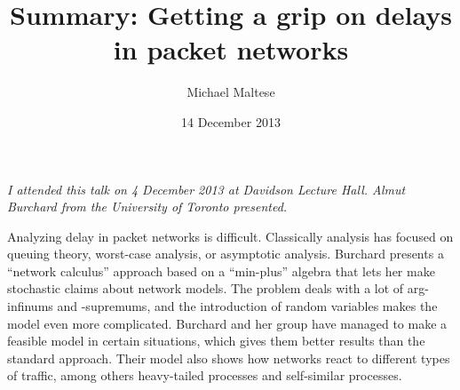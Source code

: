 \documentclass[12pt]{article}
\title{Summary: Getting a grip on delays in packet networks}
\author{Michael Maltese}
\date{14 December 2013}
\begin{document}
\maketitle

\emph{I attended this talk on 4 December 2013 at Davidson Lecture Hall. Almut Burchard from the University of Toronto presented.}

Analyzing delay in packet networks is difficult. Classically analysis has focused on queuing theory, worst-case analysis, or asymptotic analysis. Burchard presents a ``network calculus'' approach based on a ``min-plus'' algebra that lets her make stochastic claims about network models. The problem deals with a lot of arg-infinums and -supremums, and the introduction of random variables makes the model even more complicated. Burchard and her group have managed to make a feasible model in certain situations, which gives them better results than the standard approach. Their model also shows how networks react to different types of traffic, among others heavy-tailed processes and self-similar processes.
\end{document}
